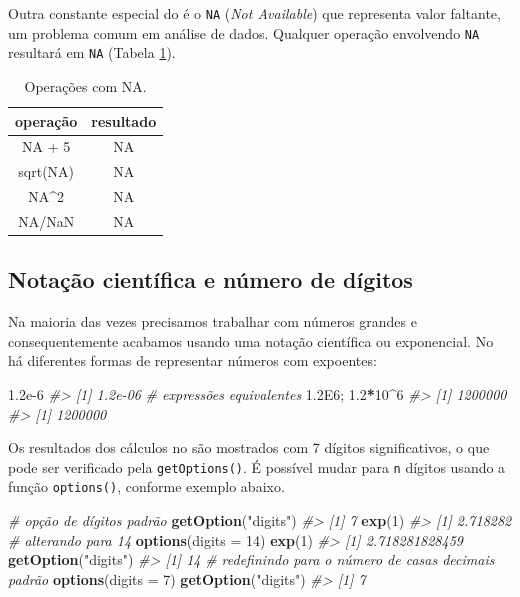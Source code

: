\documentclass[]{book}
\newenvironment{Shaded}{\begin{snugshade}}{\end{snugshade}}
\newcommand{\KeywordTok}[1]{\textcolor[rgb]{0.13,0.29,0.53}{\textbf{#1}}}
\newcommand{\DataTypeTok}[1]{\textcolor[rgb]{0.13,0.29,0.53}{#1}}
\newcommand{\DecValTok}[1]{\textcolor[rgb]{0.00,0.00,0.81}{#1}}
\newcommand{\FloatTok}[1]{\textcolor[rgb]{0.00,0.00,0.81}{#1}}
\newcommand{\StringTok}[1]{\textcolor[rgb]{0.31,0.60,0.02}{#1}}
\newcommand{\CommentTok}[1]{\textcolor[rgb]{0.56,0.35,0.01}{\textit{#1}}}
\newcommand{\OperatorTok}[1]{\textcolor[rgb]{0.81,0.36,0.00}{\textbf{#1}}}
\newcommand{\NormalTok}[1]{#1}
\begin{document}
Outra constante especial do é o \texttt{NA} (\emph{Not Available}) que
representa valor faltante, um problema comum em análise de dados.
Qualquer operação envolvendo \texttt{NA} resultará em \texttt{NA}
(Tabela \ref{tab:tab-nas}).

\begin{table}

\caption{\label{tab:tab-nas}Operações com NA.}
\centering
\begin{tabular}[t]{c|c}
\hline
operação & resultado\\
\hline
NA + 5 & NA\\
\hline
sqrt(NA) & NA\\
\hline
NA\textasciicircum{}2 & NA\\
\hline
NA/NaN & NA\\
\hline
\end{tabular}
\end{table}

\subsection{Notação científica e número de
dígitos}\label{notacao-cientifica-e-numero-de-digitos}

Na maioria das vezes precisamos trabalhar com números grandes e
consequentemente acabamos usando uma notação científica ou exponencial.
No há diferentes formas de representar números com expoentes:

\begin{Shaded}
\begin{Highlighting}[]
\FloatTok{1.2e-6}
\CommentTok{#> [1] 1.2e-06}
\CommentTok{# expressões equivalentes}
\FloatTok{1.2E6}\NormalTok{; }\FloatTok{1.2}\OperatorTok{*}\DecValTok{10}\OperatorTok{^}\DecValTok{6}  
\CommentTok{#> [1] 1200000}
\CommentTok{#> [1] 1200000}
\end{Highlighting}
\end{Shaded}

Os resultados dos cálculos no são mostrados com 7 dígitos
significativos, o que pode ser verificado pela \texttt{getOptions()}. É
possível mudar para \texttt{n} dígitos usando a função
\texttt{options()}, conforme exemplo abaixo.

\begin{Shaded}
\begin{Highlighting}[]
\CommentTok{# opção de dígitos padrão}
\KeywordTok{getOption}\NormalTok{(}\StringTok{"digits"}\NormalTok{)}
\CommentTok{#> [1] 7}
\KeywordTok{exp}\NormalTok{(}\DecValTok{1}\NormalTok{)}
\CommentTok{#> [1] 2.718282}
\CommentTok{# alterando para 14}
\KeywordTok{options}\NormalTok{(}\DataTypeTok{digits =} \DecValTok{14}\NormalTok{)}
\KeywordTok{exp}\NormalTok{(}\DecValTok{1}\NormalTok{)}
\CommentTok{#> [1] 2.718281828459}
\KeywordTok{getOption}\NormalTok{(}\StringTok{"digits"}\NormalTok{)}
\CommentTok{#> [1] 14}
\CommentTok{# redefinindo para o número de casas decimais padrão}
\KeywordTok{options}\NormalTok{(}\DataTypeTok{digits =} \DecValTok{7}\NormalTok{)}
\KeywordTok{getOption}\NormalTok{(}\StringTok{"digits"}\NormalTok{)}
\CommentTok{#> [1] 7}
\end{Highlighting}
\end{Shaded}
\end{document}
